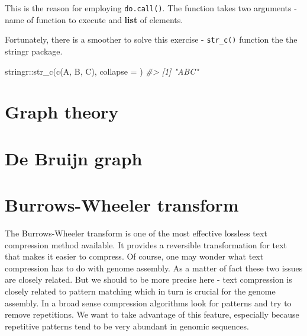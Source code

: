 \documentclass[
]{book}
\newenvironment{Shaded}{\begin{snugshade}}{\end{snugshade}}
\newcommand{\AttributeTok}[1]{\textcolor[rgb]{0.77,0.63,0.00}{#1}}
\newcommand{\CommentTok}[1]{\textcolor[rgb]{0.56,0.35,0.01}{\textit{#1}}}
\newcommand{\DecValTok}[1]{\textcolor[rgb]{0.00,0.00,0.81}{#1}}
\newcommand{\FunctionTok}[1]{\textcolor[rgb]{0.00,0.00,0.00}{#1}}
\newcommand{\NormalTok}[1]{#1}
\newcommand{\SpecialCharTok}[1]{\textcolor[rgb]{0.00,0.00,0.00}{#1}}
\newcommand{\StringTok}[1]{\textcolor[rgb]{0.31,0.60,0.02}{#1}}
\begin{document}
This is the reason for employing \texttt{do.call()}. The function takes two arguments - name of function to execute and \textbf{list} of elements.

Fortunately, there is a smoother to solve this exercise - \texttt{str\_c()} function the the stringr package.

\begin{Shaded}
\begin{Highlighting}[]
\NormalTok{stringr}\SpecialCharTok{::}\FunctionTok{str\_c}\NormalTok{(}\FunctionTok{c}\NormalTok{(}\StringTok{\textquotesingle{}A\textquotesingle{}}\NormalTok{, }\StringTok{\textquotesingle{}B\textquotesingle{}}\NormalTok{, }\StringTok{\textquotesingle{}C\textquotesingle{}}\NormalTok{), }\AttributeTok{collapse =} \StringTok{\textquotesingle{}\textquotesingle{}}\NormalTok{)}
\CommentTok{\#\textgreater{} [1] "ABC"}
\end{Highlighting}
\end{Shaded}

\begin{Shaded}
\end{Shaded}

\hypertarget{graph}{%
\chapter{Graph theory}\label{graph}}

\hypertarget{bruijn}{%
\chapter{De Bruijn graph}\label{bruijn}}

\hypertarget{bwt}{%
\chapter{Burrows-Wheeler transform}\label{bwt}}

The Burrows-Wheeler transform is one of the most effective lossless text compression method available. It provides a reversible transformation for text that makes it easier to compress. Of course, one may wonder what text compression has to do with genome assembly. As a matter of fact these two issues are closely related. But we should to be more precise here - text compression is closely related to pattern matching which in turn is crucial for the genome assembly. In a broad sense compression algorithms look for patterns and try to remove repetitions. We want to take advantage of this feature, especially because repetitive patterns tend to be very abundant in genomic sequences.
\end{document}
